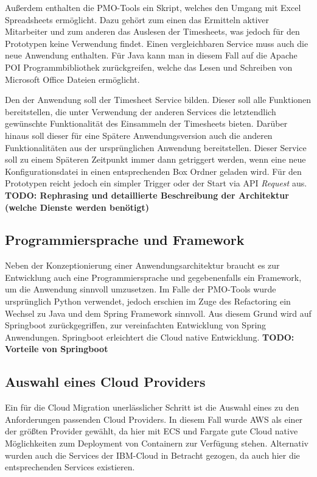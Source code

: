Außerdem enthalten die PMO-Tools ein \grqq{} Skript, welches den Umgang mit Excel Spreadsheets ermöglicht. Dazu gehört zum einen das Ermitteln aktiver Mitarbeiter und zum anderen das Auslesen der Timesheets, was jedoch für den Prototypen keine Verwendung findet. Einen vergleichbaren Service muss auch die neue Anwendung enthalten. Für Java kann man in diesem Fall auf die Apache POI Programmbibliothek zurückgreifen, welche das Lesen und Schreiben von Microsoft Office Dateien ermöglicht.

Den \grqq{} der Anwendung soll der Timesheet Service bilden. Dieser soll alle Funktionen bereitstellen, die unter Verwendung der anderen Services die letztendlich gewünschte Funktionalität des Einsammeln der Timesheets bieten. Darüber hinaus soll dieser für eine Spätere Anwendungsversion auch die anderen Funktionalitäten aus der ursprünglichen Anwendung bereitstellen. Dieser Service soll zu einem Späteren Zeitpunkt immer dann getriggert werden, wenn eine neue Konfigurationsdatei in einen entsprechenden \gls{Box} Ordner geladen wird. Für den Prototypen reicht jedoch ein simpler Trigger oder der Start via \ac{API} \textit{Request} aus. \textbf{TODO: Rephrasing und detaillierte Beschreibung der Architektur (welche Dienste werden benötigt)}\pagebreak

\subsection{Programmiersprache und Framework}
Neben der Konzeptionierung einer Anwendungsarchitektur braucht es zur Entwicklung auch eine Programmiersprache und gegebenenfalls ein Framework, um die Anwendung sinnvoll umzusetzen. Im Falle der PMO-Tools wurde ursprünglich Python verwendet, jedoch erschien im Zuge des Refactoring ein Wechsel zu Java und dem \gls{Spring} Framework sinnvoll. Aus diesem Grund wird auf \gls{Springboot} zurückgegriffen, zur vereinfachten Entwicklung von \gls{Spring} Anwendungen. \gls{Springboot} erleichtert die Cloud native Entwicklung. \textbf{TODO: Vorteile von Springboot}

\subsection{Auswahl eines Cloud Providers}
Ein für die Cloud Migration unerlässlicher Schritt ist die Auswahl eines zu den Anforderungen passenden Cloud Providers. In diesem Fall wurde \ac{AWS} als einer der größten Provider gewählt, da hier mit \ac{ECS} und Fargate gute Cloud native Möglichkeiten zum Deployment von Containern zur Verfügung stehen. Alternativ wurden auch die Services der IBM-Cloud in Betracht gezogen, da auch hier die entsprechenden Services existieren. \pagebreak